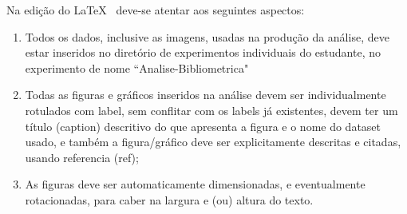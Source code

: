 Na edição do \LaTeX~ deve-se atentar aos seguintes aspectos:
\begin{enumerate}
    \item Todos os dados, inclusive as imagens, usadas na produção da análise, deve estar inseridos no diretório de experimentos individuais do estudante, no experimento de nome ``Analise-Bibliometrica"
    \item Todas as figuras e gráficos inseridos na análise devem ser individualmente rotulados com label, sem conflitar com os labels já existentes, devem ter um título (caption) descritivo do que apresenta a figura e o nome do dataset usado, e também a figura/gráfico deve ser explicitamente descritas e citadas, usando referencia (ref);
    \item As figuras deve ser automaticamente dimensionadas, e eventualmente rotacionadas,  para caber na largura e (ou) altura do texto. 
\end{enumerate}